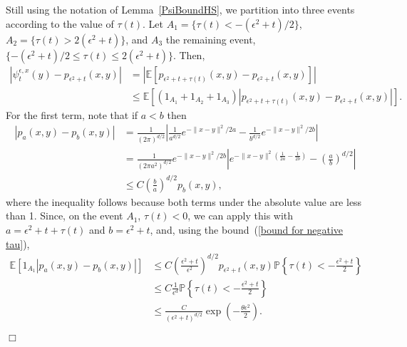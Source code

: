 \documentclass[12pt]{article}
\newenvironment {proof}{{\noindent\bf Proof }}{\hfill $\Box$ \medskip}
\newcommand{\IP}{\mathbb P}
\newcommand{\IE}{\mathbb E}
\numberwithin{equation}{section}
\begin{document}
\begin{proof}
    Still using the notation of Lemma~\ref{PsiBoundHS},
 we partition into three events according to the value of $\tau(t)$.
    Let $A_1 = \{ \tau(t) < - (\epsilon^2 + t)/2 \}$,
    $A_2 = \{ \tau(t) > 2(\epsilon^2 + t) \}$,
    and $A_3$ the remaining event, $\{ - (\epsilon^2 + t)/2 \le \tau(t) \le 2(\epsilon^2 + t) \}$.
    Then,
    \begin{align*}
        \left|
            \psi_t^{\epsilon, x}(y)
            -
            p_{\epsilon^2 + t}(x, y)
        \right|
        &=
        \left|
        \IE\left[
            p_{\epsilon^2 + t + \tau(t)}(x, y)
            -
            p_{\epsilon^2 + t}(x, y)
        \right]
        \right|
        \\&\le
        \IE\left[
            (1_{A_1} + 1_{A_2} + 1_{A_3})
            \left|
            p_{\epsilon^2 + t + \tau(t)}(x, y)
            -
            p_{\epsilon^2 + t}(x, y)
        \right|
        \right] .
    \end{align*}
    For the first term, note that if $a < b$ then
    \begin{align*}
        |p_a(x, y) - p_b(x, y)| 
        &=
        \frac{1}{(2\pi)^{d/2}}
        \left|
            \frac{1}{a^{d/2}}
            e^{-\|x - y\|^2 / 2a}
            -
            \frac{1}{b^{d/2}}
            e^{-\|x - y\|^2 / 2b}
        \right|
        \\ &=
        \frac{1}{(2\pi a^2)^{d/2}}
            e^{-\|x - y\|^2 / 2b}
        \left|
            e^{-\|x - y\|^2 \left(\frac{1}{2a} - \frac{1}{2b}\right)}
            -
            \left(\frac{a}{b}\right)^{d/2}
        \right|
        \\ &\le
        C \left(\frac{b}{a}\right)^{d/2}
        p_b(x, y) ,
    \end{align*}
    where the inequality follows because both terms under the absolute value 
are less than 1.
Since, on the event $A_1$, $\tau(t)<0$, we can  
apply this with $a = \epsilon^2 + t + \tau(t)$ and $b = \epsilon^2 + t$,
and, using the bound~(\ref{bound for negative tau}),
    \begin{align*}
        \IE\left[
            1_{A_1} |p_a(x, y) - p_b(x, y)| 
        \right]
        & \le
            C \left(\frac{\epsilon^2 + t}{\epsilon^2}\right)^{d/2}
            p_{\epsilon^2 + t}(x, y) 
            \IP\left\{ \tau(t) < - \frac{\epsilon^2 + t}{2} \right\}
        \\ & \le
            C \frac{1}{\epsilon^d}
            \IP\left\{ \tau(t) < - \frac{\epsilon^2 + t}{2} \right\}
        \\ & \le
	    \frac{C}{(\epsilon^2+t)^{d/2}} \exp\left(-\frac{\theta \epsilon^2}{2} \right) .
    \end{align*}


\end{proof}
\end{document}
